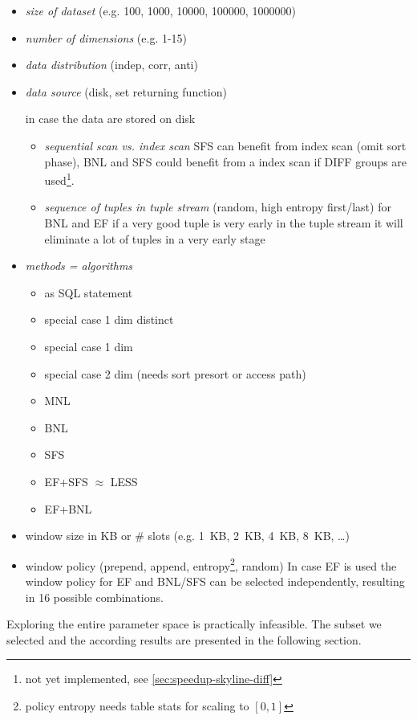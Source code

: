 \begin{itemize}
\item \emph{size of dataset} (e.g. 100, 1000, 10000, 100000, 1000000)
\item \emph{number of dimensions} (e.g. 1-15)
\item \emph{data distribution} (indep, corr, anti)
\item \emph{data source} (disk, set returning function)

in case the data are stored on disk
\begin{itemize}
\item 
\emph{sequential scan vs. index scan} SFS can benefit from index scan
(omit sort phase), BNL and SFS could benefit from a index scan if
DIFF groups are used\footnote{not yet implemented, see \autoref{sec:speedup-skyline-diff}}.

\item 
\emph{sequence of tuples in tuple stream} 
(random, high entropy first/last) for BNL and EF if a very good tuple
is very early in the tuple stream it will eliminate a lot of tuples in
a very early stage
\end{itemize}
\item \emph{methods = algorithms}

\begin{itemize}
\item as SQL statement
\item special case 1 dim distinct
\item special case 1 dim 
\item special case 2 dim (needs sort presort or access path)
\item MNL
\item BNL
\item SFS
\item EF+SFS $\approx$ LESS
\item EF+BNL
\end{itemize}

\item window size in KB or \# slots (e.g. 1~KB, 2~KB, 4~KB, 8~KB, \ldots)
\item
window policy (prepend, append, entropy\footnote{policy entropy needs
table stats for scaling to $[0,1]$}, random) In case EF is used the
window policy for EF and BNL/SFS can be selected independently,
resulting in 16 possible combinations.
\end{itemize}

Exploring the entire parameter space is practically infeasible.  The
subset we selected and the according results are presented in the
following section.

